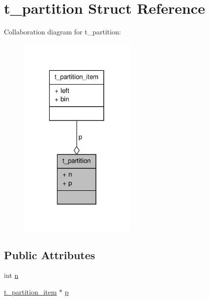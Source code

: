 \hypertarget{structt__partition}{\section{t\-\_\-partition \-Struct \-Reference}
\label{structt__partition}
}


\-Collaboration diagram for t\-\_\-partition\-:
\nopagebreak
\begin{figure}[H]
\begin{center}
\leavevmode
\includegraphics[width=162pt]{structt__partition__coll__graph}
\end{center}
\end{figure}
\subsection*{\-Public \-Attributes}
\begin{DoxyCompactItemize}
\item 
int \hyperlink{structt__partition_a2458a54a00798d8c1afc16ecc6d0cf90}{n}
\item 
\hyperlink{structt__partition__item}{t\-\_\-partition\-\_\-item} $\ast$ \hyperlink{structt__partition_abb79c5907944546a76cf7ae9bd9033d4}{p}
\end{DoxyCompactItemize}


